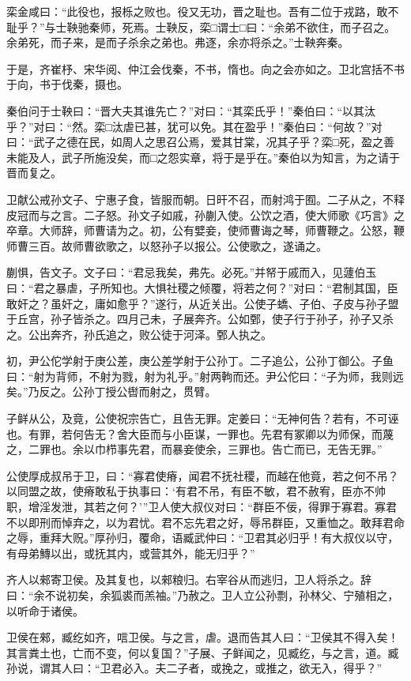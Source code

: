 \documentclass[]{article}
\begin{document}
栾金咸曰：``此役也，报栎之败也。役又无功，晋之耻也。吾有二位于戎路，敢不耻乎？''与士鞅驰秦师，死焉。士鞅反，栾□谓士□曰：``余弟不欲住，而子召之。余弟死，而子来，是而子杀余之弟也。弗逐，余亦将杀之。''士鞅奔秦。

于是，齐崔杼、宋华阅、仲江会伐秦，不书，惰也。向之会亦如之。卫北宫括不书于向，书于伐秦，摄也。

秦伯问于士鞅曰：``晋大夫其谁先亡？''对曰：``其栾氏乎！''秦伯曰：``以其汰乎？''对曰：``然。栾□汰虐已甚，犹可以免。其在盈乎！''秦伯曰：``何故？''对曰：``武子之德在民，如周人之思召公焉，爱其甘棠，况其子乎？栾□死，盈之善未能及人，武子所施没矣，而□之怨实章，将于是乎在。''秦伯以为知言，为之请于晋而复之。

卫献公戒孙文子、宁惠子食，皆服而朝。日旰不召，而射鸿于囿。二子从之，不释皮冠而与之言。二子怒。孙文子如戚，孙蒯入使。公饮之酒，使大师歌《巧言》之卒章。大师辞，师曹请为之。初，公有嬖妾，使师曹诲之琴，师曹鞭之。公怒，鞭师曹三百。故师曹欲歌之，以怒孙子以报公。公使歌之，遂诵之。

蒯惧，告文子。文子曰：``君忌我矣，弗先。必死。''并帑于戚而入，见蘧伯玉曰：``君之暴虐，子所知也。大惧社稷之倾覆，将若之何？''对曰：``君制其国，臣敢奸之？虽奸之，庸如愈乎？''遂行，从近关出。公使子蟜、子伯、子皮与孙子盟于丘宫，孙子皆杀之。四月己未，子展奔齐。公如鄄，使子行于孙子，孙子又杀之。公出奔齐，孙氏追之，败公徒于河泽。鄄人执之。

初，尹公佗学射于庚公差，庚公差学射于公孙丁。二子追公，公孙丁御公。子鱼曰：``射为背师，不射为戮，射为礼乎。''射两軥而还。尹公佗曰：``子为师，我则远矣。''乃反之。公孙丁授公辔而射之，贯臂。

子鲜从公，及竟，公使祝宗告亡，且告无罪。定姜曰：``无神何告？若有，不可诬也。有罪，若何告无？舍大臣而与小臣谋，一罪也。先君有冢卿以为师保，而蔑之，二罪也。余以巾栉事先君，而暴妾使余，三罪也。告亡而已，无告无罪。''

公使厚成叔吊于卫，曰：``寡君使瘠，闻君不抚社稷，而越在他竟，若之何不吊？以同盟之故，使瘠敢私于执事曰：`有君不吊，有臣不敏，君不赦宥，臣亦不帅职，增淫发泄，其若之何？'''卫人使大叔仪对曰：``群臣不佞，得罪于寡君。寡君不以即刑而悼弃之，以为君忧。君不忘先君之好，辱吊群臣，又重恤之。敢拜君命之辱，重拜大贶。''厚孙归，覆命，语臧武仲曰：``卫君其必归乎！有大叔仪以守，有母弟鱄以出，或抚其内，或营其外，能无归乎？''

齐人以郲寄卫侯。及其复也，以郲粮归。右宰谷从而逃归，卫人将杀之。辞曰：``余不说初矣，余狐裘而羔袖。''乃赦之。卫人立公孙剽，孙林父、宁殖相之，以听命于诸侯。

卫侯在郲，臧纥如齐，唁卫侯。与之言，虐。退而告其人曰：``卫侯其不得入矣！其言粪土也，亡而不变，何以复国？''子展、子鲜闻之，见臧纥，与之言，道。臧孙说，谓其人曰：``卫君必入。夫二子者，或挽之，或推之，欲无入，得乎？''
\end{document}
